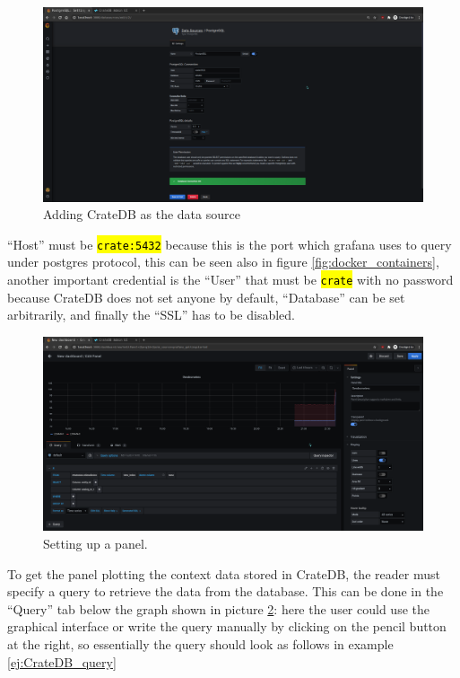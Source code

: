 \documentclass[11pt,a4paper,dvipsnames,twoside]{article}
\newcommand{\cmd}[1] {\hl{\texttt{#1}}}
\begin{document}
\begin{figure}[ht]
  \centering
  \includegraphics[width=.9\textwidth]{../pictures/Grafana_add_datasource.png}
  \caption{Adding CrateDB as the data source}
  \label{fig:Grafana_add_datasource}
\end{figure}

\enquote{Host} must be \cmd{crate:5432} because this is the port which grafana uses to query under postgres protocol, this can be seen also in figure \ref{fig:docker_containers}, another important credential is the \enquote{User} that must be \cmd{crate} with no password because CrateDB does not set anyone by default, \enquote{Database} can be set arbitrarily, and finally the \enquote{SSL} has to be disabled.

\begin{figure}[ht]
  \centering
  \includegraphics[width=.9\textwidth]{../pictures/Grafana_panel_setup.png}
  \caption{Setting up a panel.}
  \label{fig:panel_setup}
\end{figure}

To get the panel plotting the context data stored in CrateDB, the reader must specify a query to retrieve the data from the database. This can be done in the \enquote{Query} tab below the graph shown in picture \ref{fig:panel_setup}: here the user could use the graphical interface or write the query manually by clicking on the pencil button at the right, so essentially the query should look as follows in example \ref{ej:CrateDB_query}
\end{document}
